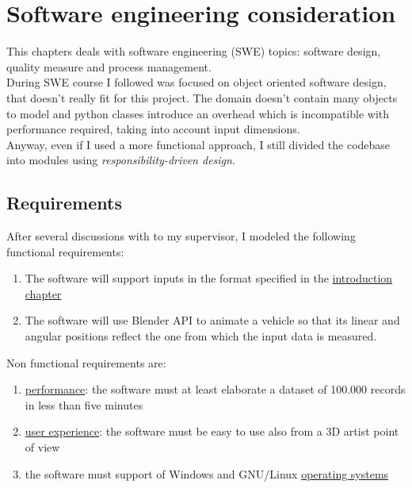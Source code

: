 \chapter{Software engineering consideration}
\label{chap:software_engineering_consideration}

This chapters deals with software engineering (SWE) topics: software design, quality measure and process management. \\
During SWE course I followed was focused on object oriented software design, that doesn't really fit for this project. The domain doesn't contain many objects to model and python classes introduce an overhead which is incompatible with performance required, taking into account input dimensions. \\
Anyway, even if I used a more functional approach, I still divided the codebase into modules using \textit{responsibility-driven design}.

\section{Requirements}
After several discussions with to my supervisor, I modeled the following functional requirements:
\begin{enumerate}
\item The software will support inputs in the format specified in the \hyperref[chap:intro]{introduction chapter}
\item The software will use Blender API to animate a vehicle so that its linear and angular positions reflect the one from which the input data is measured.
\end{enumerate}
Non functional requirements are:
\begin{enumerate} 
\item \underline{performance}: the software must at least elaborate a dataset of 100.000 records in less than five minutes
\item \underline{user experience}: the software must be easy to use also from a 3D artist point of view
\item the software must support of Windows and GNU/Linux \underline{operating systems}
\end{enumerate}

